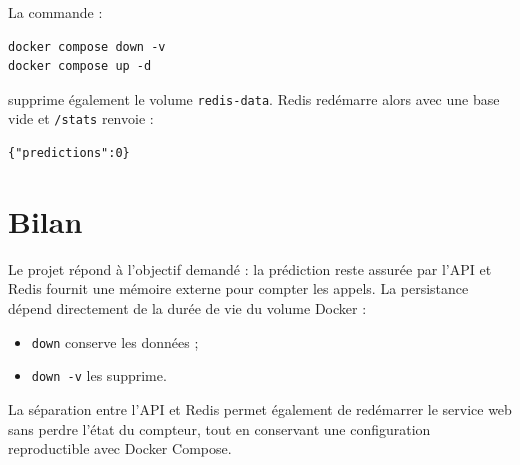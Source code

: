 \documentclass[12pt,a4paper]{article}
\begin{document}
La commande :

\begin{lstlisting}
docker compose down -v
docker compose up -d
\end{lstlisting}

supprime également le volume \texttt{redis-data}. Redis redémarre alors avec
une base vide et \texttt{/stats} renvoie :

\begin{lstlisting}
{"predictions":0}
\end{lstlisting}

\section{Bilan}

Le projet répond à l'objectif demandé : la prédiction reste assurée par l'API
et Redis fournit une mémoire externe pour compter les appels. La persistance
dépend directement de la durée de vie du volume Docker :
\begin{itemize}
  \item \texttt{down} conserve les données ;
  \item \texttt{down -v} les supprime.
\end{itemize}

La séparation entre l'API et Redis permet également de redémarrer le service
web sans perdre l'état du compteur, tout en conservant une configuration
reproductible avec Docker Compose.
\end{document}
